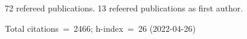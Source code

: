 72 refereed publications. 13 refeered publications as first author.

Total citations~=~2466; h-index~=~26 (2022-04-26)